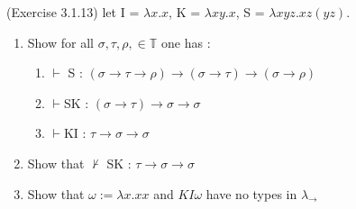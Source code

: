 (Exercise 3.1.13) 
let I = $\lambda x.x$, K = $\lambda xy.x$, S = $\lambda xyz.xz(yz)$.
	\begin{enumerate}[label = \Roman*)]
		\item 
			Show for all $\sigma, \tau, \rho, \in \mathbb{T}$ one has : 
			\begin{enumerate}
				\item $\vdash$ S : $(\sigma \rightarrow \tau \rightarrow \rho)\rightarrow (\sigma \rightarrow \tau) \rightarrow (\sigma \rightarrow \rho)$
				\item $\vdash$SK : $(\sigma \rightarrow \tau) \rightarrow \sigma \rightarrow \sigma$
				\item $\vdash$KI : $\tau \rightarrow \sigma \rightarrow \sigma$
			\end{enumerate}	
			\item 
				Show that $\not \vdash$ SK : $\tau \rightarrow \sigma \rightarrow \sigma$
			\item 
				Show that $\omega := \lambda x.xx$ and $KI\omega$ have no types in $\lambda_{\rightarrow}$
	\end{enumerate}
